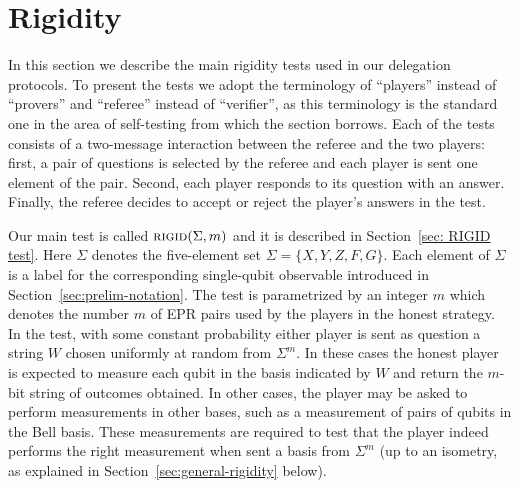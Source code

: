 












 



















\section{Rigidity}
\label{sec:intro-rigidity}


In this section we describe the main rigidity tests used in our delegation protocols. To present the tests we adopt the terminology of ``players'' instead of ``provers'' and ``referee'' instead of ``verifier'', as this terminology is the standard one in the area of self-testing from which the section borrows. Each of the tests consists of a two-message interaction between the referee and the two players: first, a pair of questions is selected by the referee and each player is sent one element of the pair. Second, each player responds to its question with an answer. Finally, the referee decides to accept or reject the player's answers in the test. 

Our main test is called $\textsc{rigid}(\Sigma,m)$ and it is described in Section~\ref{sec: RIGID test}. Here $\Sigma$ denotes the five-element set $\Sigma = \{X,Y,Z,F,G\}$. Each element of $\Sigma$ is a label for the corresponding single-qubit observable introduced in Section~\ref{sec:prelim-notation}. The test is parametrized by an integer $m$ which denotes the number $m$ of EPR pairs used by the players in the honest strategy. In the test, with some constant probability either player is sent as question a string $W$ chosen uniformly at random from $\Sigma^m$. In these cases the honest player is expected to measure each qubit in the basis indicated by $W$ and return the $m$-bit string of outcomes obtained. In other cases, the player may be asked to perform measurements in other bases, such as a measurement of pairs of qubits in the Bell basis. These measurements are required to test that the player indeed performs the right measurement when sent a basis from $\Sigma^m$ (up to an isometry, as explained in Section~\ref{sec:general-rigidity} below). 

